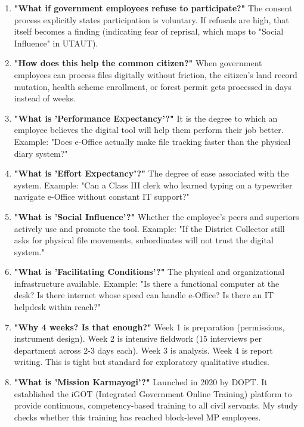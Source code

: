 \documentclass[11pt,a4paper]{article}
\begin{document}
\begin{enumerate}[itemsep=8pt]
    \item \textbf{"What if government employees refuse to participate?"} The consent process explicitly states participation is voluntary. If refusals are high, that itself becomes a finding (indicating fear of reprisal, which maps to "Social Influence" in UTAUT).

    \item \textbf{"How does this help the common citizen?"} When government employees can process files digitally without friction, the citizen's land record mutation, health scheme enrollment, or forest permit gets processed in days instead of weeks.

    \item \textbf{"What is 'Performance Expectancy'?"} It is the degree to which an employee believes the digital tool will help them perform their job better. Example: "Does e-Office actually make file tracking faster than the physical diary system?"

    \item \textbf{"What is 'Effort Expectancy'?"} The degree of ease associated with the system. Example: "Can a Class III clerk who learned typing on a typewriter navigate e-Office without constant IT support?"

    \item \textbf{"What is 'Social Influence'?"} Whether the employee's peers and superiors actively use and promote the tool. Example: "If the District Collector still asks for physical file movements, subordinates will not trust the digital system."

    \item \textbf{"What is 'Facilitating Conditions'?"} The physical and organizational infrastructure available. Example: "Is there a functional computer at the desk? Is there internet whose speed can handle e-Office? Is there an IT helpdesk within reach?"

    \item \textbf{"Why 4 weeks? Is that enough?"} Week 1 is preparation (permissions, instrument design). Week 2 is intensive fieldwork (15 interviews per department across 2-3 days each). Week 3 is analysis. Week 4 is report writing. This is tight but standard for exploratory qualitative studies.

    \item \textbf{"What is 'Mission Karmayogi'?"} Launched in 2020 by DOPT. It established the iGOT (Integrated Government Online Training) platform to provide continuous, competency-based training to all civil servants. My study checks whether this training has reached block-level MP employees.


\end{enumerate}
\end{document}
